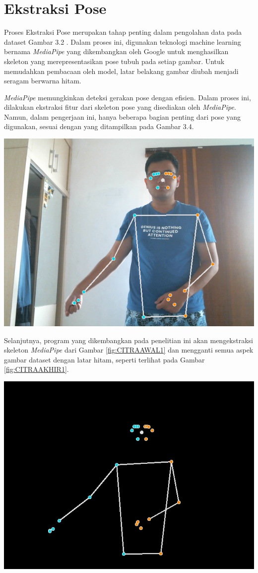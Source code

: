 \section{Ekstraksi Pose}
Proses Ekstraksi Pose merupakan tahap penting dalam pengolahan data pada dataset Gambar 3.2 . Dalam proses ini, digunakan teknologi machine learning bernama \textit{MediaPipe} yang dikembangkan oleh Google untuk menghasilkan skeleton yang merepresentasikan pose tubuh pada setiap gambar. Untuk memudahkan pembacaan oleh model, latar belakang gambar diubah menjadi seragam berwarna hitam.

\textit{MediaPipe} memungkinkan deteksi gerakan pose dengan efisien. Dalam proses ini, dilakukan ekstraksi fitur dari skeleton pose yang disediakan oleh \textit{MediaPipe}. Namun, dalam pengerjaan ini, hanya beberapa bagian penting dari  pose yang digunakan, sesuai dengan yang ditampilkan pada Gambar 3.4.
\begin{center}
	\includegraphics[width=0.7\linewidth]{gambar/Gambar3.3.png}
	\label{fig:CITRAAWAL1}
\end{center}
Selanjutnya, program yang dikembangkan pada penelitian ini akan mengekstraksi skeleton \textit{MediaPipe} dari Gambar \ref{fig:CITRAAWAL1} dan mengganti semua aspek gambar dataset dengan latar hitam, seperti terlihat pada Gambar \ref{fig:CITRAAKHIR1}.
\begin{center}
	\includegraphics[width=0.7\linewidth]{gambar/Gambar3.4.jpg}
	\label{fig:CITRAAKHIR1}
\end{center}

